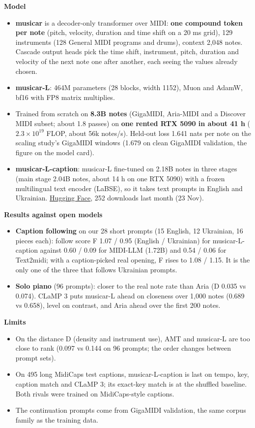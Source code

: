 \documentclass[11pt,a4paper]{article}
\newcommand{\weblink}[2]{\href{#1}{\textcolor{blue!60!black}{\underline{#2}}}}
\begin{document}
\textbf{Model}
\begin{itemize}
\item \textbf{musicar} is a decoder-only transformer over MIDI: \textbf{one compound token per note} (pitch,
velocity, duration and time shift on a 20 ms grid), 129 instruments (128 General MIDI programs and drums), context
2,048 notes. Cascade output heads pick the time shift, instrument, pitch, duration and velocity of the next note
one after another, each seeing the values already chosen.
\item \textbf{musicar-L}: 464M parameters (28 blocks, width 1152), Muon and AdamW, bf16 with FP8 matrix multiplies.
\item Trained from scratch on \textbf{8.3B notes} (GigaMIDI, Aria-MIDI and a Discover MIDI subset; about 1.8 passes) on
\textbf{one rented RTX 5090 in about 41 h} ($2.3\times10^{19}$ FLOP, about 56k notes/s). Held-out loss 1.641 nats per
note on the scaling study's GigaMIDI windows (1.679 on clean GigaMIDI validation, the figure on the model card).
\item \textbf{musicar-L-caption}: musicar-L fine-tuned on 2.18B notes in three stages (main stage 2.04B notes, about 14 h on one RTX 5090) with a frozen multilingual text
encoder (LaBSE), so it takes text prompts in English and Ukrainian.
\weblink{https://huggingface.co/Dimitri-206265/musicar-L-caption}{Hugging Face}, 252 downloads last month (23 Nov).
\end{itemize}

\medskip
\textbf{Results against open models}
\begin{itemize}
\item \textbf{Caption following} on our 28 short prompts (15 English, 12 Ukrainian, 16 pieces each): follow score F
1.07 / 0.95 (English / Ukrainian) for musicar-L-caption against 0.60 / 0.09 for MIDI-LLM (1.72B) and 0.54 / 0.06 for
Text2midi; with a caption-picked real opening, F rises to 1.08 / 1.15. It is the only one of the three that follows
Ukrainian prompts.
\item \textbf{Solo piano} (96 prompts): closer to the real note rate than Aria (D 0.035 vs 0.074). CLaMP 3 puts musicar-L
ahead on closeness over 1,000 notes (0.689 vs 0.658), level on contrast, and Aria ahead over the first 200 notes.
\end{itemize}

\medskip
\textbf{Limits}
\begin{itemize}
\item On the distance D (density and instrument use), AMT and musicar-L are too close to rank (0.097 vs 0.144 on 96 prompts; the order
changes between prompt sets).
\item On 495 long MidiCaps test captions, musicar-L-caption is last on tempo, key, caption match and CLaMP 3; its exact-key match is at the shuffled baseline. Both
rivals were trained on MidiCaps-style captions.
\item The continuation prompts come from GigaMIDI validation, the same corpus family as the training data.
\end{itemize}
\end{document}

